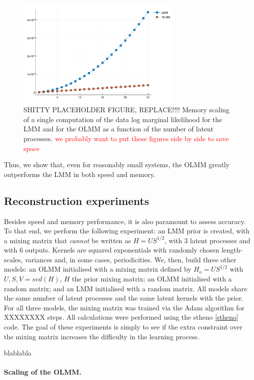 \documentclass{article}
\begin{document}
\begin{figure}
    \centering
    \includegraphics[width=8cm]{memscaling.png}
    \caption{SHITTY PLACEHOLDER FIGURE, REPLACE!!!! Memory scaling of a single computation of the data log marginal likelihood for the LMM and for the OLMM as a function of the number of latent processes. \textcolor{red}{we probably want to put these figures side by side to save space}}
    \label{fig:mscale}
\end{figure}

Thus, we show that, even for reasonably small systems, the OLMM greatly outperforms the LMM in both speed and memory.

\subsection{Reconstruction experiments}

Besides speed and memory performance, it is also paramount to assess accuracy.
To that end, we perform the following experiment: an LMM prior is created, with a mixing matrix that \emph{cannot} be written as $H = U S^{1/2}$, with 3 latent processes and with 6 outputs.
Kernels are squared exponentials with randomly chosen length-scales, variances and, in some cases, periodicities.
We, then, build three other models: an OLMM initialised with a mixing matrix defined by $H_o = U S^{1/2}$ with $U, S, V = svd(H)$, $H$ the prior mixing matrix; an OLMM initialised with a random matrix; and an LMM initialised with a random matrix. All models share the same number of latent processes and the same latent kernels with the prior.
For all three models, the mixing matrix was trained via the Adam algorithm for XXXXXXXX steps.
All calculations were performed using the stheno \cref{stheno} code.
The goal of these experiments is simply to see if the extra constraint over the mixing matrix increases the difficulty in the learning process.

blablabla

\paragraph{Scaling of the OLMM.}
\end{document}
